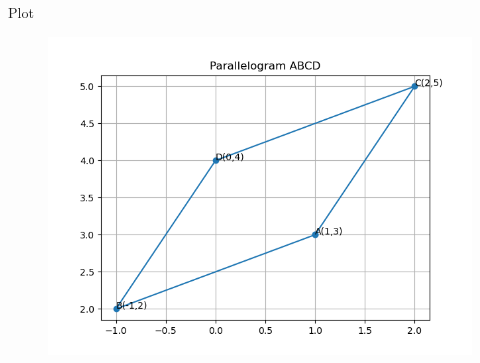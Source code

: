 \documentclass{beamer}
\begin{document}
\begin{frame}{Plot}
\begin{figure}[h!]
    \centering
    \includegraphics[height=0.6\textheight, keepaspectratio]{figs/plotc.png}
    \label{figure_1}
\end{figure}

\end{frame}
    
\end{document}
